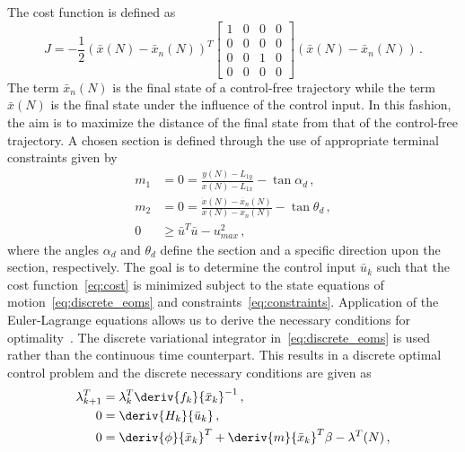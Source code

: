 The cost function is defined as
\begin{equation}
	J = -\frac{1}{2} \left( \bar{x}(N) - \bar{x}_{n}(N)\right)^T 
	\left[
	\begin{array}{cccc}
		1 & 0& 0& 0 \\
		 0& 0& 0& 0\\
		 0 & 0 & 1 &0\\
		 0 & 0& 0& 0
	\end{array}
	\right]
	\left( \bar{x}(N) - \bar{x}_{n}(N)\right) \, .
	\label{eq:cost}
\end{equation}
The term \( \bar{x}_n(N) \) is the final state of a control-free trajectory while the term \( \bar{x}(N) \) is the final state under the influence of the control input.
In this fashion, the aim is to maximize the distance of the final state from that of the control-free trajectory. 
A chosen \Poincare section is defined through the use of appropriate terminal constraints given by
\begin{subequations}
\begin{align}
    m_1 &= 0 = \frac{y(N) - L_{1y}}{x(N) - L_{1x}} - \tan{\alpha_d} \, , \\ 
    m_2&= 0 = \frac{\dot{x}(N) - \dot{x_n}(N) }{x(N) -x_n(N) } - \tan{\theta_d} \, , \\
	 0 &\geq\bar{u}^T \bar{u} - u_{max}^2 \, ,
\end{align}
    \label{eq:constraints}
\end{subequations}
where the angles \( \alpha_d\) and \( \theta_d\) define the \Poincare section and a specific direction upon the section, respectively. 
The goal is to determine the control input \( \bar{u}_k\) such that the cost function~\cref{eq:cost} is minimized subject to the state equations of motion~\cref{eq:discrete_eoms} and constraints~\cref{eq:constraints}.
Application of the Euler-Lagrange equations allows us to derive the necessary conditions for optimality~\cite{bryson1975}.
The discrete variational integrator in~\cref{eq:discrete_eoms} is used rather than the continuous time counterpart. 
This results in a discrete optimal control problem and the discrete necessary conditions are given as
\begin{subequations}\label{eq:necc_cond}
\begin{align}
	\lambda_{k+1}^T &= \lambda_k^T  \deriv{f_k}{\bar{x}_k}^{-1} \, , \\
	0 &=  \deriv{H_k}{\bar{u}_k} \, ,\\
	0 &= \deriv{\phi}{\bar{x}_k}^T + \deriv{m}{\bar{x}_k}^T\beta  - \lambda^T(N) \, ,  
\end{align}
\end{subequations}
